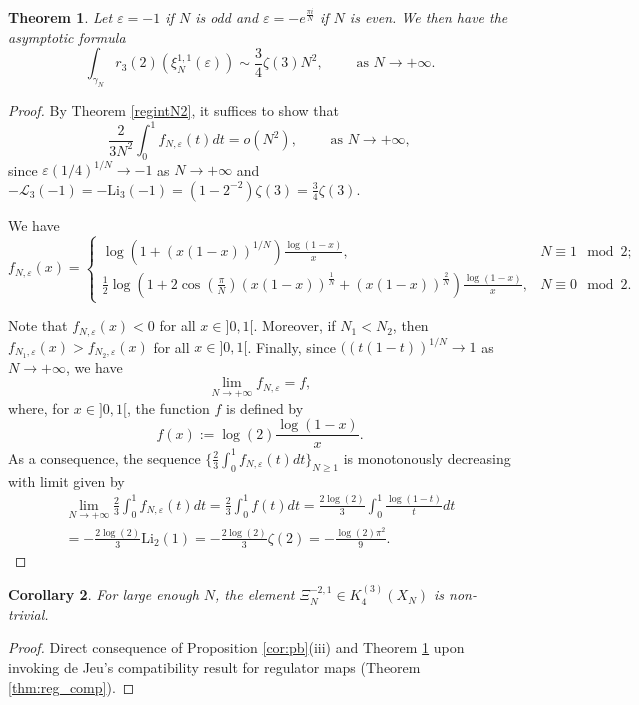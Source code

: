 \documentclass[11pt,a4,leqno]{amsart}
\theoremstyle{my theoremstyle}
\newtheorem{thm}{Theorem}[section]
\newtheorem{cor}[thm]{Corollary}
\theoremstyle{dfn}
\theoremstyle{remark}
\renewcommand{\1}{\mathbbm{1}}
\newcommand{\e}{\varepsilon}
\numberwithin{equation}{section}
\begin{document}
\begin{thm}\label{thm:asy}
    Let $\e=-1$ if $N$ is odd and $\e=-e^{\frac{\pi i}{N}}$ if $N$ is even. We then have the asymptotic formula
    \[
    \int_{\gamma_N} r_3(2)(\xi_N^{1,1}(\e)) \sim \frac{3}{4} \zeta(3) N^2, \qquad \text{ as } N\to +\infty.
    \]
\end{thm}

\begin{proof}
    By Theorem \ref{regintN2}, it suffices to show that 
    \[
    \frac{2}{3N^2} \int_0^1 f_{N,\e}(t)dt = o(N^2), \qquad \text{ as } N\to +\infty,
    \]
    since $\e (1/4)^{1/N} \to -1$ as $N\to +\infty$ and $-\mathcal{L}_3(-1)=-\mathrm{Li}_3(-1)=(1-2^{-2})\zeta(3)=\frac{3}{4} \zeta(3)$.

    We have
    \[
f_{N,\e}(x)=
\begin{cases}
    \log(1+(x(1-x))^{1/N}) \frac{\log(1-x)}{x}, & N\equiv 1\mod 2; \\
    \frac12 \log (1+2 \cos (\frac{\pi}N) (x(1-x))^{\frac1N} + (x(1-x))^{\frac2N}) \frac{\log(1-x)}x, & N\equiv 0\mod 2.
\end{cases}
\]
    
Note that $f_{N, \e}(x)<0$ for all $x\in ]0,1[$. Moreover,
if $N_1<N_2$, then $f_{N_1, \e}(x)> f_{N_2, \e}(x)$ for all $x\in ]0,1[$. Finally, since $((t(1-t))^{1/N}\to 1$ as $N\to +\infty$, we have 
\[
\lim_{N\to + \infty} f_{N, \e} = f,
\]
where, for $x\in ]0,1[$, the function $f$ is defined by
\[
f(x):=\log(2)\frac{\log(1-x)}{x}.
\]
As a consequence, the sequence $\{\frac23 \int_0^1 f_{N,\e}(t)dt\}_{N\geq 1}$ is monotonously decreasing with limit given by 
\begin{multline*}
    \lim_{N\to +\infty} \frac23  \int_0^1 f_{N,\e}(t)dt = \frac{2}{3}\int_0^{1} f(t) dt=\frac{2\log(2)}{3}\int_0^1 \frac{\log(1-t)}{t} dt \\ = -\frac{2\log(2)}{3} \mathrm{Li}_2(1) =-\frac{2\log(2)}{3}\zeta(2)=-\frac{\log(2)\pi^2}{9}.
\end{multline*}
\end{proof}

\begin{cor}
    For large enough $N$, the element $\Xi^{-2,1}_N\in K_4^{(3)}(X_{N})$ is non-trivial.
\end{cor}

\begin{proof}
    Direct consequence of Proposition \ref{cor:pb}(iii) and Theorem \ref{thm:asy} upon invoking de Jeu's compatibility result for regulator maps (Theorem \ref{thm:reg_comp}).
\end{proof}
\end{document}
